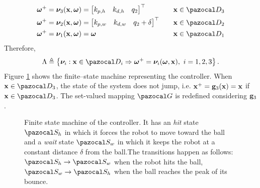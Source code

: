 %
\begin{align*}
\bm\omega^+ = \bm\nu_{3}(\xb,\bm\omega) &=\begin{bmatrix}k_{p,h}&k_{d,h}&q_2\end{bmatrix}^\top &\quad&\xb\in\D_3\\
\bm\omega^+ = \bm\nu_{2}(\xb,\bm\omega) &=\begin{bmatrix}k_{p,w}&k_{d,w}&q_2 + \delta\end{bmatrix}^\top &\quad&\xb\in\D_2\\
\bm\omega^+ = \bm\nu_{1}(\xb,\bm\omega) &= \bm\omega &\quad&\xb\in\D_1
\end{align*}
%
Therefore,
%
\begin{equation}
    \Lambda \triangleq \left\{{\bm\nu}_i:\xb\in\D_i\Rightarrow \bm\omega^+ = \bm\nu_i(\bm\omega,\xb),~ i = 1,2,3\right\}.
\end{equation}
%
Figure \ref{fig:ctrl} shows the finite--state machine representing the controller.
When $\xb\in\D_3$, the state of the system does not jump, i.e. $\mathbf{x}^+ = \mathbf{g}_3(\mathbf{x})= \mathbf{x}$ if $\xb\in\D_3$.
The set-valued mapping $\G$ is redefined considering $\mathbf{g}_3$.
%
\begin{figure}[h]
	\centering
	\caption{Finite state machine of the controller. It has an \textit{hit} state $\Sa_h$ in which it forces the robot to move toward the ball and a \textit{wait} state $\Sa_w$ in which it keeps the robot at a constant distance $\delta$ from the ball.The transitions happen as follows: $\Sa_h\rightarrow\Sa_w$ when the robot hits the ball, $\Sa_w\rightarrow\Sa_h$ when the ball reaches the peak of its bounce.}
	\label{fig:ctrl}
\end{figure}
